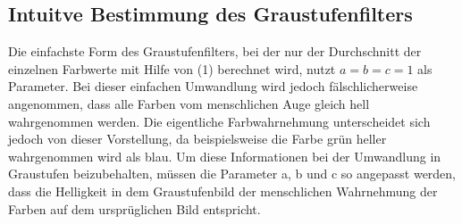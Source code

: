 \documentclass[course=erap]{aspdoc}
\begin{document}
	\subsection{Intuitve Bestimmung des Graustufenfilters}
	Die einfachste Form des Graustufenfilters, bei der nur der Durchschnitt der einzelnen Farbwerte mit Hilfe von (1) berechnet wird, nutzt $a=b=c=1$ als Parameter. Bei dieser einfachen Umwandlung wird jedoch fälschlicherweise angenommen, dass alle Farben vom menschlichen Auge gleich hell wahrgenommen werden. Die eigentliche Farbwahrnehmung unterscheidet sich jedoch von dieser Vorstellung, da beispielsweise die Farbe grün heller wahrgenommen wird als blau. Um diese Informationen bei der Umwandlung in Graustufen beizubehalten, müssen die Parameter a, b und c so angepasst werden, dass die Helligkeit in dem Graustufenbild der menschlichen Wahrnehmung der Farben auf dem ursprüglichen Bild entspricht.
\end{document}

